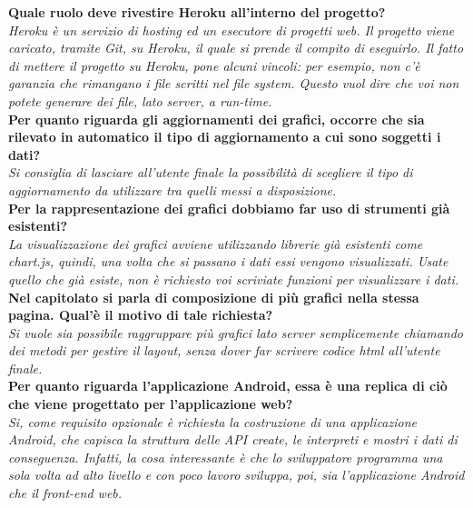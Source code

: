 	\textbf{Quale ruolo deve rivestire Heroku all'interno del progetto?}\\
	\textit{Heroku è un servizio di hosting ed un esecutore di progetti web. Il progetto viene caricato, tramite Git, su Heroku, il quale si prende il compito di eseguirlo. Il fatto di mettere il progetto su Heroku, pone alcuni vincoli: per esempio, non c'è garanzia che rimangano i file scritti nel file system. Questo vuol dire che voi non potete generare dei file, lato server, a run-time.}\\
	
	\textbf{Per quanto riguarda gli aggiornamenti dei grafici, occorre che sia rilevato in automatico il tipo di aggiornamento a cui sono soggetti i dati?}\\
	\textit{Si consiglia di lasciare all'utente finale la possibilità di scegliere il tipo di aggiornamento da utilizzare tra quelli messi a disposizione.}\\
	
	\textbf{Per la rappresentazione dei grafici dobbiamo far uso di strumenti già esistenti?}\\
	\textit{La visualizzazione dei grafici avviene utilizzando librerie già esistenti come chart.js, quindi, una volta che si passano i dati essi vengono visualizzati. Usate quello che già esiste, non è richiesto voi scriviate funzioni per visualizzare i dati.}\\
	
	\textbf{Nel capitolato si parla di composizione di più grafici nella stessa pagina. Qual'è il motivo di tale richiesta?}\\
	\textit{Si vuole sia possibile raggruppare più grafici lato server semplicemente chiamando dei metodi per gestire il layout, senza dover far scrivere codice html all'utente finale.}\\
	
	\textbf{Per quanto riguarda l'applicazione Android, essa è una replica di ciò che viene progettato per l'applicazione web?}\\
	\textit{Si, come requisito opzionale è richiesta la costruzione di una applicazione Android, che capisca la struttura delle API create, le interpreti e mostri i dati di conseguenza. Infatti, la cosa interessante è che lo sviluppatore programma una sola volta ad alto livello e con poco lavoro sviluppa, poi, sia l'applicazione Android che il front-end web.}\\